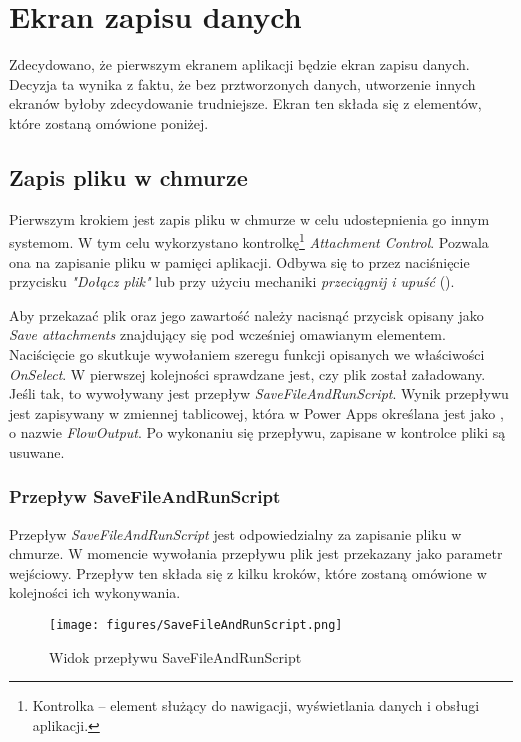 \section{Ekran zapisu danych}

Zdecydowano, że pierwszym ekranem aplikacji będzie ekran zapisu danych. Decyzja ta wynika z faktu, że bez prztworzonych danych, utworzenie innych ekranów byłoby zdecydowanie trudniejsze. Ekran ten składa się z elementów, które zostaną omówione poniżej.

\subsection{Zapis pliku w chmurze}
Pierwszym krokiem jest zapis pliku w chmurze w celu udostepnienia go innym systemom. W tym celu wykorzystano kontrolkę\footnote{Kontrolka -- element służący do nawigacji, wyświetlania danych i obsługi aplikacji.} \emph{Attachment Control}. Pozwala ona na zapisanie pliku w pamięci aplikacji. Odbywa się to przez naciśnięcie przycisku \emph{"Dołącz plik"} lub przy użyciu mechaniki \emph{przeciągnij i upuść} (). 

Aby przekazać plik oraz jego zawartość należy nacisnąć przycisk opisany jako \emph{Save attachments} znajdujący się pod wcześniej omawianym elementem. Naciścięcie go skutkuje wywołaniem szeregu funkcji opisanych we właściwości \emph{OnSelect}. W pierwszej kolejności sprawdzane jest, czy plik został załadowany. Jeśli tak, to wywoływany jest przepływ \emph{SaveFileAndRunScript}. Wynik przepływu jest zapisywany w zmiennej tablicowej, która w Power Apps określana jest jako , o nazwie \emph{FlowOutput}. Po wykonaniu się przepływu, zapisane w kontrolce pliki są usuwane.

\subsubsection{Przepływ SaveFileAndRunScript}
Przepływ \emph{SaveFileAndRunScript} jest odpowiedzialny za zapisanie pliku w chmurze. W momencie wywołania przepływu plik jest przekazany jako parametr wejściowy. Przepływ ten składa się z kilku kroków, które zostaną omówione w kolejności ich wykonywania.

\begin{figure}[H]
    \centering
    \texttt{[image: figures/SaveFileAndRunScript.png]}
    \caption{Widok przepływu SaveFileAndRunScript}
    \label{fig:savefileandrunscript}
\end{figure}

